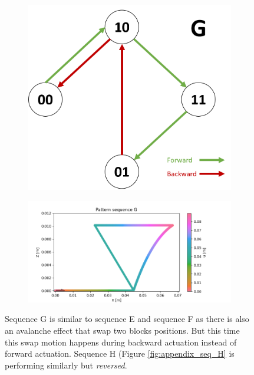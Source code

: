         \begin{figure}[h]
            \centering
            \begin{subfigure}{.2\textwidth}
            \includegraphics[width=\textwidth]{images/S_G.png}
            \end{subfigure}%
            \begin{subfigure}{.6\textwidth}
            \includegraphics[width=\textwidth]{images/G.png}
            \end{subfigure}
            \caption{Sequence G is similar to sequence E and sequence F as there is also an avalanche effect that swap two blocks positions. But this time this swap motion happens during backward actuation instead of forward actuation. Sequence H (Figure \ref{fig:appendix_seq_H} is performing similarly but \textit{reversed}.}
        \end{figure}

